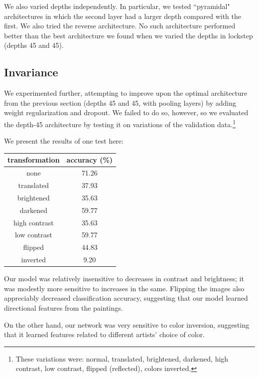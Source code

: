 \documentclass{article}
\begin{document}
\begin{multicols}{2}
We also varied depths independently.
In particular,
we tested ``pyramidal" architectures
in which the second layer had a larger depth
compared with the first.
We also tried the reverse architecture.
No such architecture performed better
than the best architecture we found when
we varied the depths in lockstep (depths 45 and 45).


\subsection{Invariance}

We experimented further,
attempting to improve upon the optimal architecture
from the previous section
(depths 45 and 45, with pooling layers)
by adding weight regularization and dropout.
We failed to do so, however,
so we evaluated the depth-45 architecture
by testing it on variations of the validation data.\footnote{These
    variations were:
    normal, translated, brightened, darkened,
    high contrast, low contrast, flipped (reflected), colors inverted.}

We present the results of one test here:
\begin{center}
    \begin{tabular}{c|c}
        transformation & accuracy (\%) \\\hline
        none & 71.26 \\
        translated & 37.93\\
        brightened & 35.63\\
        darkened & 59.77\\
        high contrast & 35.63 \\
        low contrast &59.77\\
        flipped & 44.83\\
        inverted & 9.20%
    \end{tabular}
\end{center}
Our model was relatively insensitive
to decreases in contrast and brightness;
it was modestly more sensitive to increases in the same.
Flipping the images also appreciably decreased classification accuracy,
suggesting that our model learned directional features from the paintings.

On the other hand,
our network was very sensitive to color inversion,
suggesting that it learned features
related to different artists' choice of color.



\end{multicols}
\end{document}
